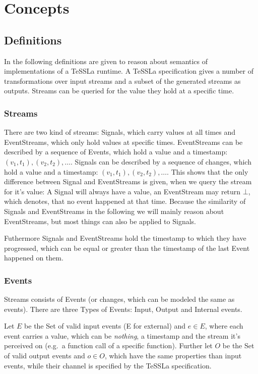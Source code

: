 \chapter{Concepts}
\label{sec:concepts}

\section{Definitions}
\label{sec:concepts:defs}

In the following definitions are given to reason about semantics of implementations of a TeSSLa runtime.
A TeSSLa specification gives a number of transformations over input streams and a subset of the generated streams as outputs.
Streams can be queried for the value they hold at a specific time.

\subsection{Streams}
\label{sec:concepts:defs:streams}

There are two kind of streams: Signals, which carry values at all times and EventStreams, which only hold values at specific times.
EventStreams can be described by a sequence of Events, which hold a value and a timestamp: \((v_1,t_1),(v_2,t_2),\ldots\).
Signals can be described by a sequence of changes, which hold a value and a timestamp: \((v_1,t_1),(v_2,t_2),\ldots\).
This shows that the only difference between Signal and EventStreams is given, when we query the stream for it's value:
A Signal will always have a value, an EventStream may return \(\bot\), which denotes, that no event happened at that time.
Because the similarity of Signals and EventStreams in the following we will mainly reason about EventStreams, but most things can also be applied to Signals.

Futhermore Signals and EventStreams hold the timestamp to which they have progressed, which can be equal or greater than the timestamp of the last Event happened on them.

\subsection{Events}
\label{sec:concepts:defs:events}

Streams consists of Events (or changes, which can be modeled the same as events).
There are three Types of Events: Input, Output and Internal events.

Let \(E\) be the Set of valid input events (E for external) and \(e \in E\), where each event carries a value, which can be \emph{nothing}, a timestamp and the
stream it's perceived on (e.g.\ a function call of a specific function).
Further let \(O\) be the Set of valid output events and \(o \in O\), which have the same properties than input events, while their channel is specified by the TeSSLa specification.

